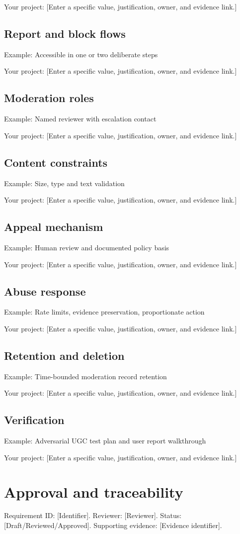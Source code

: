 \documentclass[11pt]{article}
\begin{document}
Your project: [Enter a specific value, justification, owner, and evidence link.]


\subsection{Report and block flows}
Example: Accessible in one or two deliberate steps

Your project: [Enter a specific value, justification, owner, and evidence link.]


\subsection{Moderation roles}
Example: Named reviewer with escalation contact

Your project: [Enter a specific value, justification, owner, and evidence link.]


\subsection{Content constraints}
Example: Size, type and text validation

Your project: [Enter a specific value, justification, owner, and evidence link.]


\subsection{Appeal mechanism}
Example: Human review and documented policy basis

Your project: [Enter a specific value, justification, owner, and evidence link.]


\subsection{Abuse response}
Example: Rate limits, evidence preservation, proportionate action

Your project: [Enter a specific value, justification, owner, and evidence link.]


\subsection{Retention and deletion}
Example: Time-bounded moderation record retention

Your project: [Enter a specific value, justification, owner, and evidence link.]


\subsection{Verification}
Example: Adversarial UGC test plan and user report walkthrough

Your project: [Enter a specific value, justification, owner, and evidence link.]


\section{Approval and traceability}
Requirement ID: [Identifier]. Reviewer: [Reviewer]. Status: [Draft/Reviewed/Approved]. Supporting evidence: [Evidence identifier].
\end{document}
